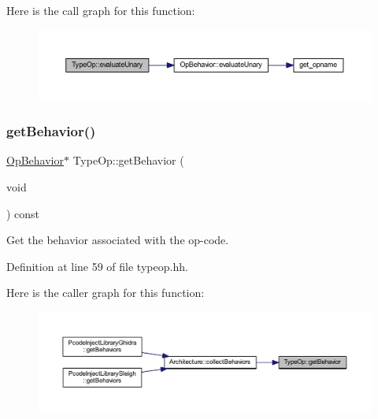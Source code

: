 Here is the call graph for this function\+:
\nopagebreak
\begin{figure}[H]
\begin{center}
\leavevmode
\includegraphics[width=350pt]{class_type_op_a44947ba9af3fb0f2a7b2023d2a3038ca_cgraph}
\end{center}
\end{figure}
\mbox{\label{class_type_op_a088cd2447161e17f6b29aa0882daac83}} 
\subsubsection{\texorpdfstring{getBehavior()}{getBehavior()}}
{\footnotesize\ttfamily \mbox{\hyperlink{class_op_behavior}{Op\+Behavior}}$\ast$ Type\+Op\+::get\+Behavior (\begin{DoxyParamCaption}\item[{void}]{ }\end{DoxyParamCaption}) const\hspace{0.3cm}{\ttfamily [inline]}}



Get the behavior associated with the op-\/code. 



Definition at line 59 of file typeop.\+hh.

Here is the caller graph for this function\+:
\nopagebreak
\begin{figure}[H]
\begin{center}
\leavevmode
\includegraphics[width=350pt]{class_type_op_a088cd2447161e17f6b29aa0882daac83_icgraph}
\end{center}
\end{figure}
\mbox{\label{class_type_op_acef6af9a0ebdbfb22f258f634f810525}} 
